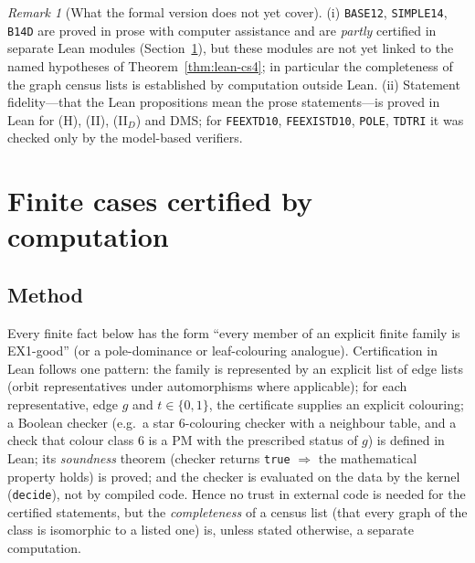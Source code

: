 \documentclass[11pt]{amsart}
\theoremstyle{definition}
\theoremstyle{remark}
\newtheorem{remark}[theorem]{Remark}
\newcommand{\hyp}[1]{\textup{(#1)}}
\newcommand{\Lean}{\textsf{Lean}}
\begin{document}
\begin{remark}[What the formal version does not yet cover]
(i) \texttt{BASE12}, \texttt{SIMPLE14}, \texttt{B14D} are proved in prose with computer assistance and are \emph{partly} certified in separate \Lean{} modules (Section~\ref{sec:finite}), but these modules are not yet linked to the named hypotheses of Theorem~\ref{thm:lean-cs4}; in particular the completeness of the graph census lists is established by computation outside \Lean. (ii) Statement fidelity---that the \Lean{} propositions mean the prose statements---is proved in \Lean{} for \hyp{H}, \hyp{II}, \hyp{II$_D$} and DMS; for \texttt{FEEXTD10}, \texttt{FEEXISTD10}, \texttt{POLE}, \texttt{TDTRI} it was checked only by the model-based verifiers.
\end{remark}

\section{Finite cases certified by computation}\label{sec:finite}

\subsection{Method}
Every finite fact below has the form ``every member of an explicit finite family is EX1-good'' (or a pole-dominance or leaf-colouring analogue). Certification in \Lean{} follows one pattern: the family is represented by an explicit list of edge lists (orbit representatives under automorphisms where applicable); for each representative, edge $g$ and $t\in\{0,1\}$, the certificate supplies an explicit colouring; a Boolean checker (e.g.\ a star $6$-colouring checker with a neighbour table, and a check that colour class $6$ is a PM with the prescribed status of $g$) is defined in \Lean; its \emph{soundness} theorem (checker returns \texttt{true} $\Rightarrow$ the mathematical property holds) is proved; and the checker is evaluated on the data by the kernel (\texttt{decide}), not by compiled code. Hence no trust in external code is needed for the certified statements, but the \emph{completeness} of a census list (that every graph of the class is isomorphic to a listed one) is, unless stated otherwise, a separate computation.
\end{document}
